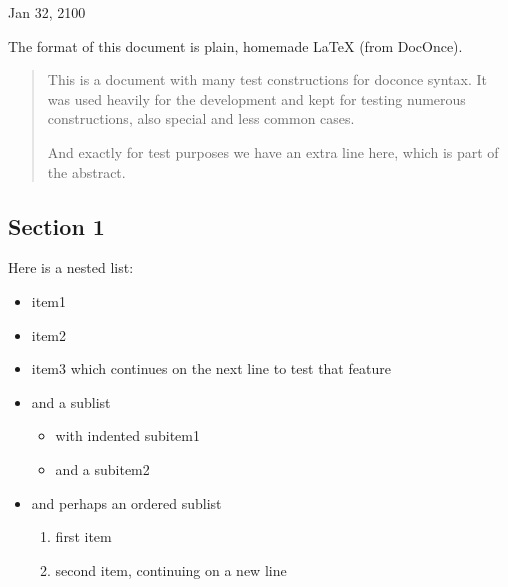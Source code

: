 \documentclass[%
oneside,                 %
final,                   %
10pt]{article}
\theoremstyle{definition}
\begin{document}

\begin{center}
Jan 32, 2100
\end{center}

\vspace{1cm}


\tableofcontents

\vspace{1cm} %


The format of this document is
plain, homemade {\LaTeX} (from DocOnce).


\begin{abstract}
This is a document with many test constructions for doconce syntax.
It was used heavily for the development and kept for testing
numerous constructions, also special and less common cases.

And exactly for test purposes we have an extra line here, which
is part of the abstract.

\end{abstract}

\subsection{Section 1}
\label{sec1}

Here is a nested list:

\begin{itemize}
  \item item1

  \item item2

  \item item3 which continues on the next line to test that feature

  \item and a sublist
\begin{itemize}

    \item with indented subitem1

    \item and a subitem2

\end{itemize}

\noindent
  \item and perhaps an ordered sublist
\begin{enumerate}

   \item first item

   \item second item, continuing on a new line
\end{enumerate}

\noindent
\end{itemize}
\end{document}
